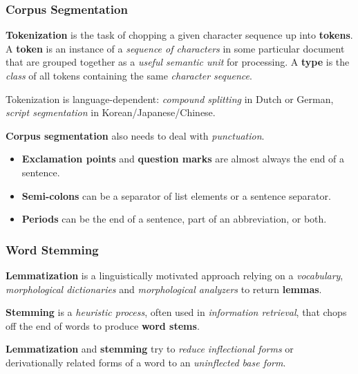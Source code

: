 \subsubsection{Corpus Segmentation}
\begin{mydef}
	\textbf{Tokenization} is the task of chopping a given character sequence up into \textbf{tokens}.
	A \textbf{token} is an instance of a \emph{sequence of characters} in some particular document that are grouped together as a \emph{useful semantic unit} for processing.
	A \textbf{type} is the \emph{class} of all tokens containing the same \emph{character sequence}.
\end{mydef}
Tokenization is language-dependent: \emph{compound splitting} in Dutch or German, \emph{script segmentation} in Korean/Japanese/Chinese.

\textbf{Corpus segmentation} also needs to deal with \emph{punctuation}.
\begin{itemize}
	\item \textbf{Exclamation points} and \textbf{question marks} are almost always the end of a sentence.
	\item \textbf{Semi-colons} can be a separator of list elements or a sentence separator.
	\item \textbf{Periods} can be the end of a sentence, part of an abbreviation, or both.
\end{itemize}

\subsubsection{Word Stemming}
\begin{mydef}[Lemmatization]
	\textbf{Lemmatization} is a linguistically motivated approach relying on a \emph{vocabulary}, \emph{morphological dictionaries} and \emph{morphological analyzers} to return \textbf{lemmas}.
\end{mydef}

\begin{mydef}[Stemming]
	\textbf{Stemming} is a \emph{heuristic process}, often used in \emph{information retrieval}, that chops off the end of words to produce \textbf{word stems}.
\end{mydef}

\textbf{Lemmatization} and \textbf{stemming} try to \emph{reduce inflectional forms} or derivationally related forms of a word to an \emph{uninflected base form}.

